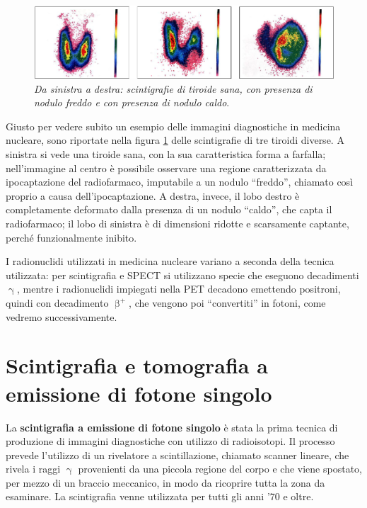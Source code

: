\documentclass{report}
\newcommand{\virgolette}[1]{``#1''}
\newcommand{\figref}[1]{figura \ref{#1}}
\numberwithin{equation}{section}
\numberwithin{figure}{section}
\begin{document}
\begin{figure}[htp]
    \centering
    \includegraphics[scale=0.75]{immagini/tiroide.png}
    \caption{\label{fig:tiroide} \textit{Da sinistra a destra: scintigrafie di tiroide sana, con presenza di nodulo freddo e con presenza di nodulo caldo}.}
\end{figure}

Giusto per vedere subito un esempio delle immagini diagnostiche in medicina nucleare, sono riportate nella \figref{fig:tiroide} delle scintigrafie di tre tiroidi diverse. A sinistra si vede una tiroide sana, con la sua caratteristica forma a farfalla; nell'immagine al centro è possibile osservare una regione caratterizzata da ipocaptazione del radiofarmaco, imputabile a un nodulo \virgolette{freddo}, chiamato così proprio a causa dell'ipocaptazione. A destra, invece, il lobo destro è completamente deformato dalla presenza di un nodulo \virgolette{caldo}, che capta il radiofarmaco; il lobo di sinistra è di dimensioni ridotte e scarsamente captante, perché funzionalmente inibito.

I radionuclidi utilizzati in medicina nucleare variano a seconda della tecnica utilizzata: per scintigrafia e SPECT si utilizzano specie che eseguono decadimenti $\upgamma$, mentre i radionuclidi impiegati nella PET decadono emettendo positroni, quindi con decadimento $\upbeta^+$, che vengono poi \virgolette{convertiti} in fotoni, come vedremo successivamente.

\section{Scintigrafia e tomografia a emissione di fotone singolo}
La \textbf{scintigrafia a emissione di fotone singolo} è stata la prima tecnica di produzione di immagini diagnostiche con utilizzo di radioisotopi. Il processo prevede l'utilizzo di un rivelatore a scintillazione, chiamato scanner lineare, che rivela i raggi $\upgamma$ provenienti da una piccola regione del corpo e che viene spostato, per mezzo di un braccio meccanico, in modo da ricoprire tutta la zona da esaminare. La scintigrafia venne utilizzata per tutti gli anni '70 e oltre.
\end{document}
